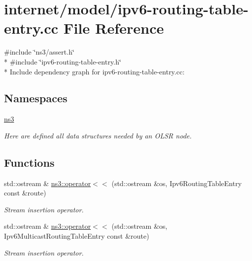 \hypertarget{ipv6-routing-table-entry_8cc}{}\section{internet/model/ipv6-\/routing-\/table-\/entry.cc File Reference}
\label{ipv6-routing-table-entry_8cc}
{\ttfamily \#include \char`\"{}ns3/assert.\+h\char`\"{}}\\*
{\ttfamily \#include \char`\"{}ipv6-\/routing-\/table-\/entry.\+h\char`\"{}}\\*
Include dependency graph for ipv6-\/routing-\/table-\/entry.cc\+:
\subsection*{Namespaces}
\begin{DoxyCompactItemize}
\item 
 \hyperlink{namespacens3}{ns3}
\begin{DoxyCompactList}\small\item\em Here are defined all data structures needed by an O\+L\+SR node. \end{DoxyCompactList}\end{DoxyCompactItemize}
\subsection*{Functions}
\begin{DoxyCompactItemize}
\item 
std\+::ostream \& \hyperlink{namespacens3_a05b3b1fa4697bd3d0e38436243095888}{ns3\+::operator$<$$<$} (std\+::ostream \&os, Ipv6\+Routing\+Table\+Entry const \&route)
\begin{DoxyCompactList}\small\item\em Stream insertion operator. \end{DoxyCompactList}\item 
std\+::ostream \& \hyperlink{namespacens3_a30841a81c3cf6b93f8f5d6358ef4b6a5}{ns3\+::operator$<$$<$} (std\+::ostream \&os, Ipv6\+Multicast\+Routing\+Table\+Entry const \&route)
\begin{DoxyCompactList}\small\item\em Stream insertion operator. \end{DoxyCompactList}\end{DoxyCompactItemize}
